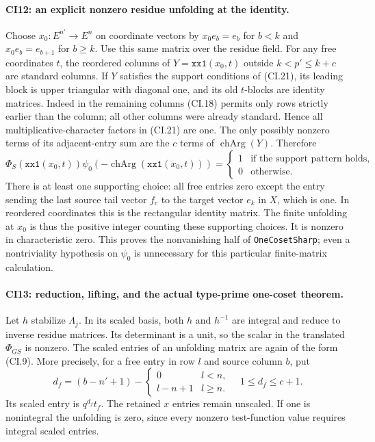 \paragraph{CI12: an explicit nonzero residue unfolding at the identity.}
Choose $x_0:E^{n'}\to E^n$ on coordinate vectors by
$x_0e_b=e_b$ for $b<k$ and $x_0e_b=e_{b+1}$ for $b\ge k$.
Use this same matrix over the residue field. For any free
coordinates $t$, the reordered columns of
$Y=\texttt{xx1}(x_0,t)$ outside $k<p'\le k+c$ are standard
columns. If $Y$ satisfies the support conditions of (CI.21), its
leading block is upper triangular with diagonal one, and its
old $t$-blocks are identity matrices. Indeed in the remaining
columns (CI.18) permits only rows strictly earlier than the
column; all other columns were already standard. Hence all
multiplicative-character factors in (CI.21) are one.
The only possibly nonzero terms of its adjacent-entry sum are
the $c$ terms of $\operatorname{chArg}(Y)$. Therefore
\[
 \Phi_S(\texttt{xx1}(x_0,t))
       \psi_0(-\operatorname{chArg}(\texttt{xx1}(x_0,t)))
   =\begin{cases}1&\text{if the support pattern holds},\\
                  0&\text{otherwise}.
     \end{cases}
 \tag{CI.24}
\]
There is at least one supporting choice: all free entries zero
except the entry sending the last source tail vector $f_c$ to
the target vector $e_k$ in $X$, which is one. In reordered
coordinates this is the rectangular identity matrix. The finite
unfolding at $x_0$ is thus the positive integer counting these
supporting choices. It is nonzero in characteristic zero.
This proves the nonvanishing half of \texttt{OneCosetSharp};
even a nontriviality hypothesis on $\psi_0$ is unnecessary for
this particular finite-matrix calculation.

\paragraph{CI13: reduction, lifting, and the actual type-prime one-coset theorem.}
Let $h$ stabilize $\Lambda_j$. In its scaled basis, both $h$ and
$h^{-1}$ are integral and reduce to inverse residue matrices.
Its determinant is a unit, so the scalar in the translated
$\Phi_{GS}$ is nonzero. The scaled entries of an unfolding
matrix are again of the form (CI.9). More precisely, for a free
entry in row $l$ and source column $b$, put
\[
 d_f=(b-n'+1)-\begin{cases}0&l<n,\\l-n+1&l\ge n.
                       \end{cases}
 \quad 1\le d_f\le c+1.
 \tag{CI.25}
\]
Its scaled entry is $q^{d_f}t_f$. The retained $x$ entries
remain unscaled. If one is nonintegral the unfolding is zero,
since every nonzero test-function value requires integral
scaled entries.

